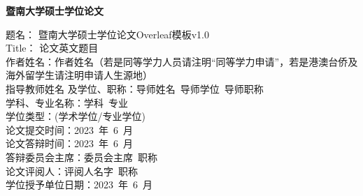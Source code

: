 \newcommand{\authorName}{作者姓名（若是同等学力人员请注明“同等学力申请”，若是港澳台侨及海外留学生请注明申请人生源地）}
\newcommand{\titleCn}{暨南大学硕士学位论文Overleaf模板v1.0}
\newcommand{\titleEn}{论文英文题目}
\newcommand{\tutor}{导师姓名\ 导师学位\ 导师职称}
\newcommand{\disciplineName}{学科\ 专业}
\newcommand{\degreeType}{(学术学位/专业学位)}
\newcommand{\commitDate}{2023\ 年\ 6\ 月}
\newcommand{\replyDate}{2023\ 年\ 6\ 月}
\newcommand{\programCoChairs}{委员会主席\ 职称}
\newcommand{\Reviewer}{评阅人名字\ 职称}
\newcommand{\grantDate}{2023\ 年\ 6\ 月}
\newcommand{\schoolName}{暨南大学}
\newcommand{\pageHeaderTitle}{暨南大学硕士学位论文}

\begin{titlepage}
\begin{flushleft}
    \li\textbf{暨南大学硕士学位论文}
\end{flushleft}
\begin{flushleft}
\vspace{25pt}
题名： \titleCn \\
Title： \titleEn    \\[25pt]
作者姓名：\authorName \\[25pt]
指导教师姓名
及学位、职称：\tutor \\[25pt]
学科、专业名称：\disciplineName \\[25pt]
学位类型：\degreeType \\[25pt]
论文提交时间：\commitDate \\[25pt]
论文答辩时间：\replyDate \\[25pt]
答辩委员会主席：\programCoChairs \\[25pt]
论文评阅人：\Reviewer\\[25pt]
学位授予单位日期：\grantDate\\[25pt]
\end{flushleft}
\end{titlepage}

